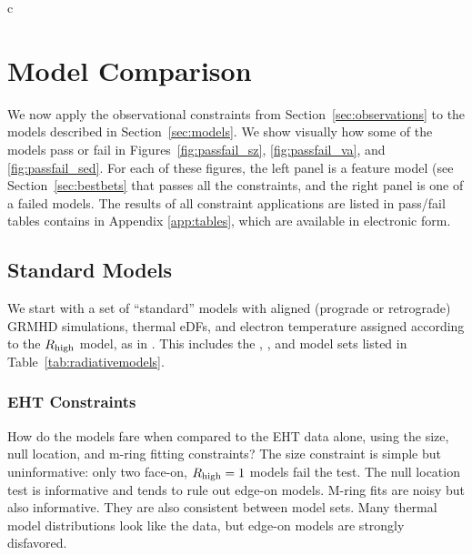 c\section{Model Comparison}\label{sec:comparisons}

We now apply the observational constraints from
Section~\ref{sec:observations} to the models described in
Section~\ref{sec:models}.
We show visually how some of the models pass or fail in
Figures~\ref{fig:passfail_sz}, \ref{fig:passfail_va}, and
\ref{fig:passfail_sed}.
For each of these figures, the left panel is a feature model (see
Section~\ref{sec:bestbets} that passes all the constraints, and the
right panel is one of a failed models.
The results of all constraint applications are listed in pass/fail
tables contains in Appendix \ref{app:tables}, which are available in
electronic form.

\subsection{Standard Models}\label{subsec:thermal}


We start with a set of ``standard'' models with aligned (prograde or retrograde) GRMHD simulations, thermal eDFs, and electron temperature assigned according to the $R_\mathrm{high}$ model, as in .  This includes the \kharma, \bhac, and \hamr model sets listed in Table~\ref{tab:radiativemodels}.

\subsubsection{EHT Constraints}

How do the models fare when compared to the EHT data alone, using the size, null location, and m-ring fitting constraints?  The size constraint is simple but uninformative: only two face-on, $R_\mathrm{high} = 1$ models fail the test.  The null location test is informative and tends to rule out edge-on models.  M-ring fits are noisy but also informative.  They are also consistent between model sets.  Many thermal model distributions look like the data, but edge-on models are strongly disfavored.


